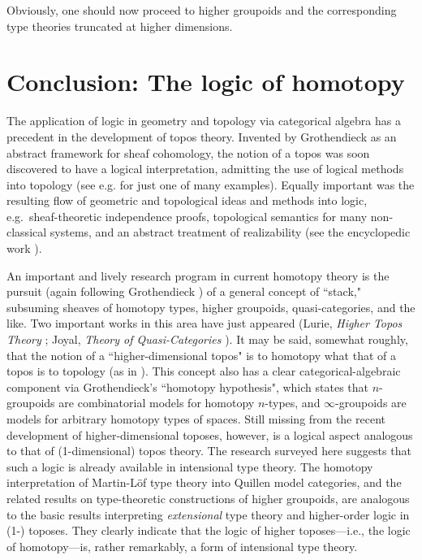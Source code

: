 \documentclass[reqno,12pt]{amsart}
\theoremstyle{definition}
\theoremstyle{remark}
\begin{document}
Obviously, one should now proceed to higher groupoids and the corresponding type theories truncated at higher dimensions. 



\section{Conclusion: The logic of homotopy}

The application of logic in geometry and topology via categorical algebra has a precedent in the development of topos theory.  Invented by Grothendieck as an abstract framework for sheaf cohomology, the notion of a topos was soon discovered to have a logical interpretation, admitting the use of logical methods into topology (see e.g. \cite{JoyalTierney:EGTG} for just one of many examples).  Equally important was the resulting flow of geometric and topological ideas and methods into logic, e.g.\ sheaf-theoretic independence proofs, topological semantics for many non-classical systems, and an abstract treatment of realizability (see the encyclopedic work \cite{Johnstone:E1}).

An important and lively research program in current homotopy theory is the pursuit (again following Grothendieck \cite{Grothendieck:PS}) of a general concept of ``stack," subsuming sheaves of homotopy types, higher groupoids, quasi-categories, and the like.  Two important works in this area have just appeared (Lurie, \emph{Higher Topos Theory} \cite{Lurie:HTT}; Joyal, \emph{Theory of Quasi-Categories} \cite{Joyal:QC}).  It may be said, somewhat roughly, that the notion of a ``higher-dimensional topos" is to homotopy what that of a topos is to topology (as in \cite{Joyal:SSCS}).  This concept also has a clear categorical-algebraic component via Grothendieck's ``homotopy hypothesis", which states that $n$-groupoids are combinatorial models for homotopy $n$-types, and $\infty$-groupoids are models for arbitrary homotopy types of spaces.  Still missing from the recent development of higher-dimensional toposes, however, is a logical aspect analogous to that of (1-dimensional) topos theory.   The research surveyed here suggests that such a logic  is already available in intensional type theory.  The homotopy interpretation of Martin-L\"of type theory into Quillen model categories, and the related results on type-theoretic constructions of higher groupoids, are analogous to the basic results interpreting \emph{extensional} type theory and higher-order logic in (1-) toposes.  They clearly indicate that the logic of higher toposes---i.e., the logic of homotopy---is, rather remarkably, a form of intensional type theory.
\end{document}
